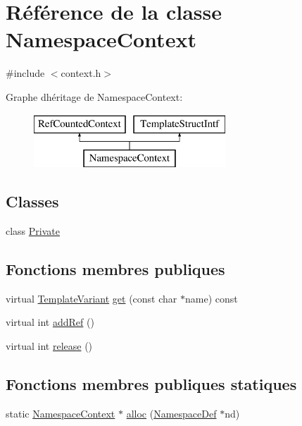 \hypertarget{class_namespace_context}{}\section{Référence de la classe Namespace\+Context}
\label{class_namespace_context}


{\ttfamily \#include $<$context.\+h$>$}

Graphe d\textquotesingle{}héritage de Namespace\+Context\+:\begin{figure}[H]
\begin{center}
\leavevmode
\includegraphics[height=2.000000cm]{class_namespace_context}
\end{center}
\end{figure}
\subsection*{Classes}
\begin{DoxyCompactItemize}
\item 
class \hyperlink{class_namespace_context_1_1_private}{Private}
\end{DoxyCompactItemize}
\subsection*{Fonctions membres publiques}
\begin{DoxyCompactItemize}
\item 
virtual \hyperlink{class_template_variant}{Template\+Variant} \hyperlink{class_namespace_context_ae8076ef0388a6ca106b263fd61774231}{get} (const char $\ast$name) const 
\item 
virtual int \hyperlink{class_namespace_context_a796dffc7c1fbe50fc7aeb9c6fd072205}{add\+Ref} ()
\item 
virtual int \hyperlink{class_namespace_context_ab7009613a99e733dd82347c46963808c}{release} ()
\end{DoxyCompactItemize}
\subsection*{Fonctions membres publiques statiques}
\begin{DoxyCompactItemize}
\item 
static \hyperlink{class_namespace_context}{Namespace\+Context} $\ast$ \hyperlink{class_namespace_context_a9e82bba7d2da7bef305c2a247f609591}{alloc} (\hyperlink{class_namespace_def}{Namespace\+Def} $\ast$nd)
\end{DoxyCompactItemize}


